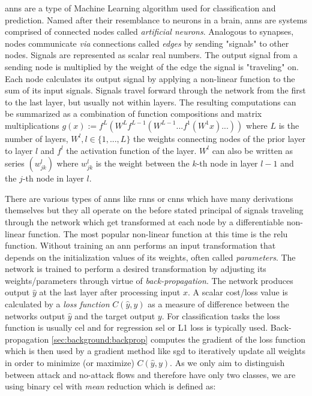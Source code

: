 \glspl{ann} are a type of Machine Learning algorithm used for classification and prediction. Named after their resemblance to neurons in a brain, \glspl{ann} are systems comprised of connected nodes called \textit{artificial neurons}. Analogous to synapses, nodes communicate \textit{via} connections called \textit{edges} by sending "signals" to other nodes. Signals are represented as scalar real numbers. The output signal from a sending node is multiplied by the weight of the edge the signal is "traveling" on. Each node calculates its output signal by applying a non-linear function to the sum of its input signals. Signals travel forward through the network from the first to the last layer, but usually not within layers. The resulting computations can be summarized as a combination of function compositions and matrix multiplications $g(x) := f^L(W^Lf^{L-1}(W^{L-1}...f^1(W^1x)...))$ where $L$ is the number of layers, $W^l, l \in \{1,...,L\}$ the weights connecting nodes of the prior layer to layer $l$ and $f^l$ the activation function of the layer. $W^l$ can also be written as series $(w^l_{jk})$ where $w^l_{jk}$ is the weight between the $k$-th node in layer $l-1$ and the $j$-th node in layer $l$. \par There are various types of \glspl{ann} like \glspl{rnn} or \glspl{cnn} which have many derivations themselves but they all operate on the before stated principal of signals traveling through the network which get transformed at each node by a differentiable non-linear function. The most popular non-linear function at this time is the \gls{relu} function. Without training an \gls{ann} performs an input transformation that depends on the initialization values of its weights, often called \textit{parameters}. The network is trained to perform a desired transformation by adjusting its weights/parameters through virtue of \textit{back-propagation}. The network produces output $\hat{y}$ at the last layer after processing input $x$. A scalar cost/loss value is calculated by a \textit{loss function} $C(\hat{y}, y)$ as a measure of difference between the networks output $\hat{y}$ and the target output $y$. For classification tasks the loss function is usually \gls{cel} and for regression \gls{sel} or L1 loss is typically used. Back-propagation \ref{sec:background:backprop} computes the gradient of the loss function which is then used by a gradient method like \gls{sgd} to iteratively update all weights in order to minimize (or maximize) $C(\hat{y}, y)$. As we only aim to distinguish between attack and no-attack flows and therefore have only two classes, we are using binary \gls{cel} with \textit{mean} reduction which is defined as:

